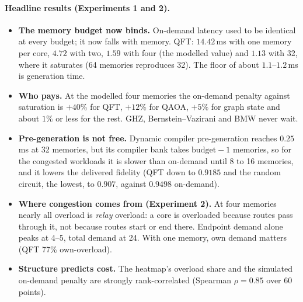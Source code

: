 \paragraph{Headline results (Experiments 1 and 2).}
\begin{itemize}
  \item \textbf{The memory budget now binds.} On-demand latency used to be identical at every budget; it now falls with memory. QFT: $14.42$\,ms with one memory per core, $4.72$ with two, $1.59$ with four (the modelled value) and $1.13$ with 32,
        where it saturates (64 memories reproduces 32). The floor of about $1.1$--$1.2$\,ms is generation time.
  \item \textbf{Who pays.} At the modelled four memories the on-demand penalty against saturation is $+40\%$ for QFT, $+12\%$ for QAOA, $+5\%$ for graph state and about $1\%$ or less for the rest. GHZ, Bernstein--Vazirani and BMW never wait.
  \item \textbf{Pre-generation is not free.} Dynamic compiler pre-generation reaches $0.25$\,ms at 32 memories, but its compiler bank takes $\text{budget}-1$ memories, so for the congested workloads it is slower than on-demand until 8 to 16 memories, and it
        lowers the delivered fidelity (QFT down to $0.9185$ and the random circuit, the lowest, to $0.907$, against $0.9498$ on-demand).
  \item \textbf{Where congestion comes from (Experiment 2).} At four memories nearly all overload is \emph{relay} overload: a core is overloaded because routes pass through it, not because routes start or end there. Endpoint demand alone peaks at 4--5, total demand at 24.
        With one memory, own demand matters (QFT 77\% own-overload).
  \item \textbf{Structure predicts cost.} The heatmap's overload share and the simulated on-demand penalty are strongly rank-correlated (Spearman $\rho=0.85$ over 60 points).
\end{itemize}

